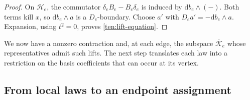 \begin{proof}
On \(\mathcal H_e\), the commutator
\(\delta_eB_e-B_e\delta_e\) is induced by
\(\mathrm db_e\wedge(-)\).  Both terms kill \(x\), so
\(\mathrm db_e\wedge a\) is a \(D_e\)-boundary.  Choose \(a'\) with
\(D_ea'=-\mathrm db_e\wedge a\).  Expansion, using \(t^2=0\), proves
\eqref{ten:lift-equation}.
\end{proof}

We now have a nonzero contraction and, at each edge, the subspace
\(\overline{\mathcal K}_e\) whose representatives admit such lifts.
The next step translates each law into a restriction on the basis
coefficients that can occur at its vertex.

\subsection{From local laws to an endpoint assignment}

